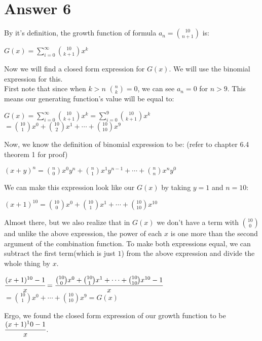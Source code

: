 \documentclass[12pt]{article}
\begin{document}
\section*{Answer 6}
By it's definition, the growth function of formula $a_n=\binom{10}{n+1}$ is:
\begin{center}
$G(x)=\sum_{i=0}^{\infty}\binom{10}{k+1}x^k$
\end{center}
Now we will find a closed form expression for $G(x)$. We will use the binomial expression for this.\\
First note that since when $k>n$ $\binom{n}{k}=0$, we can see $a_n=0$ for $n>9$. This means our generating function's value will be equal to:
\begin{center}
$G(x)=\sum_{i=0}^{\infty}\binom{10}{k+1}x^k=\sum_{i=0}^{9}\binom{10}{k+1}x^k$\\
$= \binom{10}{1}x^0+\binom{10}{2}x^1+\cdots +\binom{10}{10}x^9$
\end{center}
Now, we know the definition of binomial expression to be: (refer to chapter 6.4 theorem 1 for proof)
\begin{center}
$(x+y)^n=\binom{n}{0}x^0y^n+\binom{n}{1}x^1y^{n-1}+\cdots +\binom{n}{n}x^ny^0$
\end{center}
We can make this expression look like our $G(x)$ by taking $y=1$ and $n=10$:
\begin{center}
$(x+1)^{10}=\binom{10}{0}x^0+\binom{10}{1}x^1+\cdots +\binom{10}{10}x^{10}$
\end{center}
Almost there, but we also realize that in $G(x)$ we don't have a term with $\binom{10}{0}$ and unlike the above expression, the power of each $x$ is one more than the second argument of the combination function. To make both expressions equal, we can subtract the first term(which is just $1$) from the above expression and divide the whole thing by $x$.
\begin{center}
$\cfrac{(x+1)^{10}-1}{x}=\cfrac{\binom{10}{0}x^0+\binom{10}{1}x^1+\cdots +\binom{10}{10}x^{10}-1}{x}$\\
$=\binom{10}{1}x^0+\cdots +\binom{10}{10}x^9=G(x)$
\end{center}
Ergo, we found the closed form expression of our growth function to be $\cfrac{(x+1)^10-1}{x}$.
\end{document}

